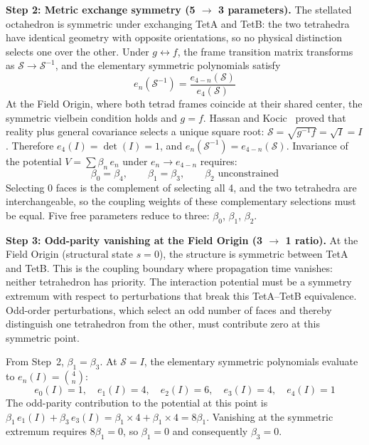 \documentclass[aps,prd,preprint,superscriptaddress,showpacs,preprintnumbers,amsmath,amssymb,nofootinbib]{revtex4-2}
\begin{document}
\textbf{Step 2: Metric exchange symmetry (5 $\to$ 3 parameters).} The stellated octahedron is symmetric under exchanging TetA and TetB: the two tetrahedra have identical geometry with opposite orientations, so no physical distinction selects one over the other. Under $g \leftrightarrow f$, the frame transition matrix transforms as $\mathcal{S} \to \mathcal{S}^{-1}$, and the elementary symmetric polynomials satisfy
\begin{equation}
e_n(\mathcal{S}^{-1}) = \frac{e_{4-n}(\mathcal{S})}{e_4(\mathcal{S})}
\end{equation}
At the Field Origin, where both tetrad frames coincide at their shared center, the symmetric vielbein condition holds and $g = f$. Hassan and Kocic~\cite{hassankocic2018} proved that reality plus general covariance selects a unique square root: $\mathcal{S} = \sqrt{g^{-1}f} = \sqrt{I} = I$. Therefore $e_4(I) = \det(I) = 1$, and $e_n(\mathcal{S}^{-1}) = e_{4-n}(\mathcal{S})$. Invariance of the potential $V = \sum \beta_n\,e_n$ under $e_n \to e_{4-n}$ requires:
\begin{equation}
\beta_0 = \beta_4, \qquad \beta_1 = \beta_3, \qquad \beta_2 \text{ unconstrained}
\end{equation}
Selecting 0 faces is the complement of selecting all 4, and the two tetrahedra are interchangeable, so the coupling weights of these complementary selections must be equal. Five free parameters reduce to three: $\beta_0$, $\beta_1$, $\beta_2$.

\textbf{Step 3: Odd-parity vanishing at the Field Origin (3 $\to$ 1 ratio).} At the Field Origin (structural state $s = 0$), the structure is symmetric between TetA and TetB. This is the coupling boundary where propagation time vanishes: neither tetrahedron has priority. The interaction potential must be a symmetry extremum with respect to perturbations that break this TetA--TetB equivalence. Odd-order perturbations, which select an odd number of faces and thereby distinguish one tetrahedron from the other, must contribute zero at this symmetric point.

From Step~2, $\beta_1 = \beta_3$. At $\mathcal{S} = I$, the elementary symmetric polynomials evaluate to $e_n(I) = \binom{4}{n}$:
\begin{equation}
e_0(I) = 1, \quad e_1(I) = 4, \quad e_2(I) = 6, \quad e_3(I) = 4, \quad e_4(I) = 1
\end{equation}
The odd-parity contribution to the potential at this point is $\beta_1\,e_1(I) + \beta_3\,e_3(I) = \beta_1 \times 4 + \beta_1 \times 4 = 8\beta_1$. Vanishing at the symmetric extremum requires $8\beta_1 = 0$, so $\beta_1 = 0$ and consequently $\beta_3 = 0$.
\end{document}
